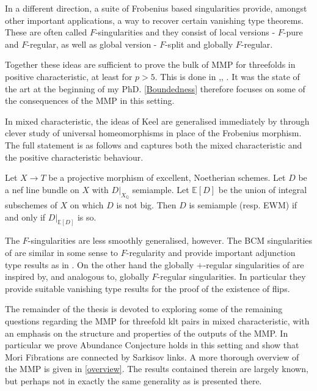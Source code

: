 \documentclass[a4paper,12pt]{book}
\begin{document}
	In a different direction, a suite of Frobenius based singularities provide, amongst other important applications, a way to recover certain vanishing type theorems. These are often called $F$-singularities and they consist of local versions - $F$-pure and $F$-regular, as well as global version - $F$-split and globally $F$-regular.
		
	Together these ideas are sufficient to prove the bulk of MMP for threefolds in positive characteristic, at least for $p > 5$. This is done in \cite{HX15},\cite{Bir16}, \cite{BW17}. It was the state of the art at the beginning of my PhD. \autoref{Boundedness} therefore focuses on some of the consequences of the MMP in this setting.
	
	In mixed characteristic, the ideas of Keel are generalised immediately by \cite{witaszek2020keels} through clever study of universal homeomorphisms in place of the Frobenius morphism. The full statement is as follows and captures both the mixed characteristic and the positive characteristic behaviour.
	
	\begin{theorem*}\cite[Theorem 1.2]{witaszek2020keels}
		Let $X \to T$ be a projective morphism of excellent, Noetherian schemes. Let $D$ be a nef line bundle on $X$ with $D|_{X_{\mathbb{Q}}}$ semiample. Let $\mathbb{E}[D]$ be the union of integral subschemes of $X$ on which $D$ is not big. Then $D$ is semiample (resp. EWM) if and only if $D|_{\mathbb{E}[D]}$ is so.
	\end{theorem*}
	
	The $F$-singularities are less smoothly generalised, however. The BCM singularities of \cite{ma2021singularities} are similar in some sense to $F$-regularity and provide important adjunction type results as in \cite{ma2019analog}. On the other hand the globally $+$-regular singularities of \cite{bhatt2020} are inspired by, and analogous to, globally $F$-regular singularities. In particular they provide suitable vanishing type results for the proof of the existence of flips. 
	
	The remainder of the thesis is devoted to exploring some of the remaining questions regarding the MMP for threefold klt pairs in mixed characteristic, with an emphasis on the structure and properties of the outputs of the MMP. In particular we prove Abundance Conjecture holds in this setting and show that Mori Fibrations are connected by Sarkisov links. A more thorough overview of the MMP is given in \autoref{overview}. The results contained therein are largely known, but perhaps not in exactly the same generality as is presented there.
	
\end{document}
